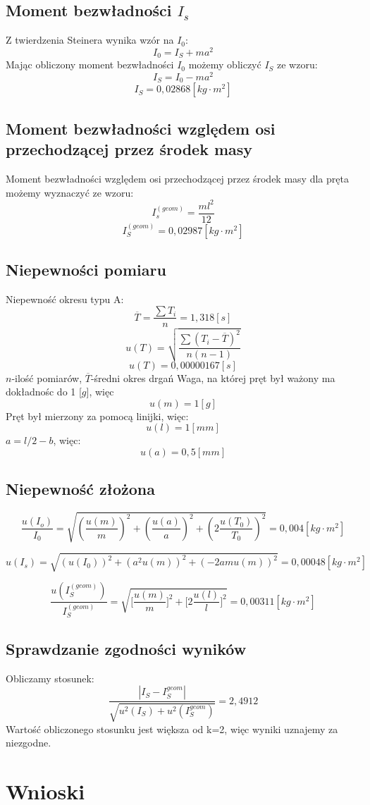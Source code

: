\documentclass[a4paper,10pt,twoside]{article}
\begin{document}
	\subsection{Moment bezwładności $I_s$}
	Z twierdzenia Steinera wynika wzór na $I_0$:
	$$I_0=I_S+ma^2$$
	Mając obliczony moment bezwładności $I_0$ możemy obliczyć $I_S$ ze wzoru:
	$$I_S=I_0-ma^2$$
	$$I_S = 0,02868[\unit{kg\cdot m^2}]$$
	
	\subsection{Moment bezwładności względem osi przechodzącej przez środek masy}
	Moment bezwładności względem osi przechodzącej przez środek masy dla pręta możemy wyznaczyć ze wzoru:
	$$I_s^{(geom)}=\frac{ml^2}{12}$$
	$$I_S^{(geom)}=0,02987[\unit{kg\cdot m^2}]$$
	\subsection{Niepewności pomiaru}
	Niepewność okresu typu A:
	$$\overline{T}=\frac{\sum{T_i}}{n}=1,318[\unit{s}]$$
	$$u(T)=\sqrt{\frac{\sum{(T_i-\overline{T})^2}}{n(n-1)}}$$
	$$u(T)=0,00000167[\unit{s}]$$
	$n$-ilość pomiarów,
	$\overline{T}$-średni okres drgań
	\newline
	\newline
	Waga, na której pręt był ważony ma dokładnośc do 1 [$\unit{g}$], więc 
	$$u(m)=1[\unit{g}]$$
	\newline
	Pręt był mierzony za pomocą linijki, więc:
	$$u(l)=1[\unit{mm}]$$
	\newline
	$a = l/2-b$, więc:
	$$u(a)=0,5[\unit{mm}]$$
	\subsection{Niepewność złożona}
	
	$$\frac{u(I_o)}{I_0}=\sqrt{\left (\frac{u(m)}{m}\right ) ^2+\left ( \frac{u(a)}{a}\right )^2+\left (2 \frac{u(T_0)}{T_0}\right )^2}=0,004[\unit{kg\cdot m^2}]$$
	
	$$u(I_s)=\sqrt{\left( u(I_0)\right)^2+\left(a^2u(m) \right)^2+\left( -2amu(m)\right)^2}=0,00048[\unit{kg\cdot m^2}]$$
	
	$$\frac{u(I_S^{(geom)})}{I_S^{(geom)}}=\sqrt{{\big[\frac{u(m)}{m}\big]^2} + \big[2\frac{u(l)}{l}\big]^2}=0,00311[\unit{kg\cdot m^2}]$$
	\subsection{Sprawdzanie zgodności wyników}
	Obliczamy stosunek:
	$$\frac{|I_S-I_S^{geom}|}{\sqrt{u^2(I_S)+u^2(I_S^{geom})}}=2,4912 $$
	\newline
	Wartość obliczonego stosunku jest większa od k=2, więc wyniki uznajemy za niezgodne.
	\section{Wnioski}
	
	
\end{document}
